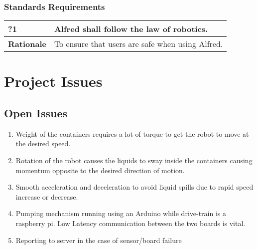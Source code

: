 \documentclass [11pt]{article}
\begin{document}
\subsubsection{Standards Requirements }

\begin{longtable}{| p{ } | p{ } | }\hline 
	\rowcolor{tableCell}\textbf{?1} & Alfred shall follow the law of robotics. \\ \hline
	\textbf{Rationale} & To ensure that users are safe when using Alfred.\\ \hline 
\end{longtable}

\section {Project Issues} 

\subsection{Open Issues}
	\begin{enumerate}[label=\textbf{(\roman*)}]
		\item Weight of the containers requires a lot of torque to get the robot to move at the desired speed.
		\item Rotation of the robot causes the liquids to sway inside the containers causing momentum opposite to the desired direction of motion.
		\item Smooth acceleration and deceleration to avoid liquid spills due to rapid speed increase or decrease.
		\item Pumping mechanism running using an Arduino while drive-train is a raspberry pi. Low Latency communication between the two boards is vital.
		\item Reporting to server in the case of sensor/board failure
		
	\end{enumerate}

\end{document}
